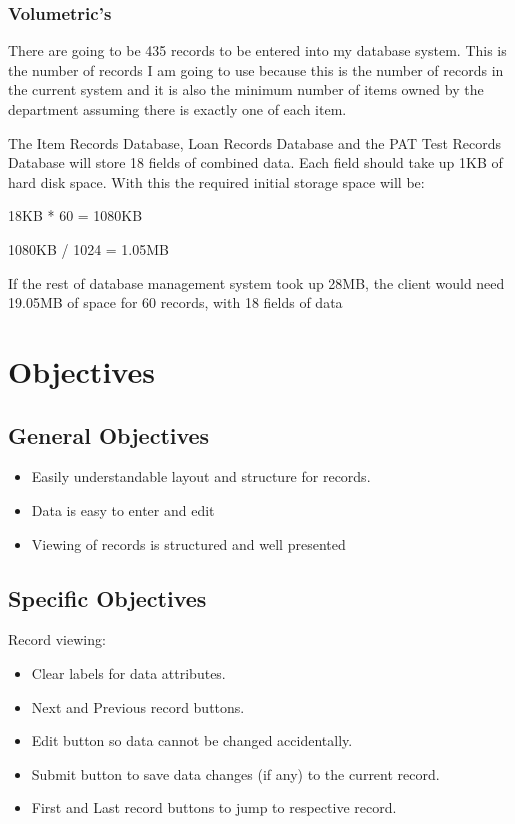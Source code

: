 \subsubsection{Volumetric's}

There are going to be 435 records to be entered into my database system. This is the number of records I am going to use because this is the number of records in the current system and it is also the minimum number of items owned by the department assuming there is exactly one of each item.

\noindent The Item Records Database, Loan Records Database and the PAT Test Records Database will store 18 fields of combined data. Each field should take up 1KB of hard disk space. With this the required initial storage space will be:

18KB * 60 = 1080KB

1080KB / 1024 = 1.05MB

If the rest of database management system took up 28MB, the client would need 19.05MB of space for 60 records, with 18 fields of data

\section{Objectives}

\subsection{General Objectives}

\begin{itemize}
	\item Easily understandable layout and structure for records.
	\item Data is easy to enter and edit
	\item Viewing of records is structured and well presented
\end{itemize}

\subsection{Specific Objectives}

Record viewing:
\begin{itemize}
    \item Clear labels for data attributes.
    \item Next and Previous record buttons.
    \item Edit button so data cannot be changed accidentally.
    \item Submit button to save data changes (if any) to the current record.
    \item First and Last record buttons to jump to respective record.
\end{itemize}

